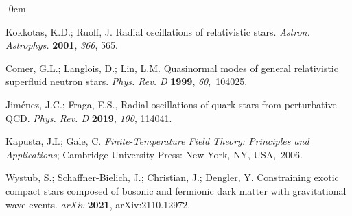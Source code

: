 \documentclass[universe,article,accept,moreauthors,pdftex]{Definitions/mdpi}
\begin{document}
\begin{adjustwidth}{-\extralength}{0cm}
\begin{thebibliography}{999}
Kokkotas, K.D.; Ruoff, J. 
Radial oscillations of relativistic stars. 
\emph{Astron. Astrophys.} \textbf{2001}, \emph{366}, 565.

Comer, G.L.; Langlois, D.; Lin, L.M. 
Quasinormal modes of general relativistic superfluid neutron stars. 
\emph{Phys. Rev. D} \textbf{1999}, \emph{60},~104025.

Jim\'enez, J.C.; Fraga, E.S.,
Radial oscillations of quark stars from perturbative QCD. 
\emph{Phys. Rev. D} \textbf{2019}, \emph{100}, 114041.

Kapusta, J.I.; Gale, C. 
{\it Finite-Temperature Field Theory: Principles and Applications}; 
Cambridge University Press: New York, NY, USA,~2006.%




Wystub, S.; Schaffner-Bielich, J.; Christian, J.; Dengler, Y. 
Constraining exotic compact stars composed of bosonic and fermionic dark matter with gravitational wave events.  \emph{arXiv} \textbf{2021}, 
arXiv:2110.12972.

\end{thebibliography}
\end{adjustwidth}


%
\end{document}
